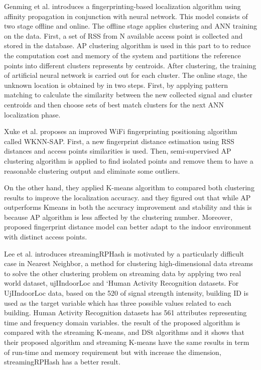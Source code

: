 \documentclass[../UNBThesis2.tex]{subfiles}
\begin{document}
Genming et al. \cite{ding2013fingerprinting} introduces a fingerprinting-based localization algorithm using affinity propagation in conjunction with neural network. 
This model consists of two stage offline and online. The offline stage applies clustering and ANN training on the data. First,  a set of RSS from N available access point is collected and stored in the database. AP clustering algorithm is used in this part to to reduce the computation cost and memory of the system and partitions the reference points into different clusters represents by centroids. After clustering, the training of artificial neural network is carried out for each cluster.
The online stage, the unknown location is obtained by in two steps. First, by applying pattern matching to calculate the similarity between the new collected signal and cluster centroids and then choose sets of best match clusters for the next ANN localization phase.

Xuke et al. \cite{hu2015improving} proposes an improved WiFi fingerprinting positioning algorithm called WKNN-SAP. First, a new fingerprint distance estimation using RSS distances and access points similarities is used. Then, semi-supervised AP clustering algorithm is applied to find isolated points and remove them to have a reasonable clustering output and eliminate some outliers.

On the other hand, they applied K-means algorithm to compared both clustering results to improve the localization accuracy. and they figured out that while AP outperforms Kmeans in both the accuracy improvement and stability and this is because AP algorithm is less affected by the clustering number. Moreover, proposed fingerprint distance model can better adapt to the indoor environment with distinct access points.






Lee et al. \cite{carraher2016random} introduces streamingRPHash is motivated by
a particularly difficult case in Nearest Neighbor, a method for clustering high-dimensional data streams to solve the other clustering problem on streaming data by applying two real world dataset, ujIIndoorLoc and ‘Human Activity Recognition datasets.
For UjIIndoorLoc data, based on the 520 of signal strength intensity, building ID is used as the target variable which has three possible values related to each building.
Human Activity Recognition datasets has 561 attributes representing time and frequency domain variables.
the result of the proposed algorithm is compared with the streaming K-means, and DSt algorithms and it shows that their proposed algorithm and streaming K-means have the same results in term of run-time and memory requirement but with increase the dimension, streamingRPHash has a better result.
\end{document}
